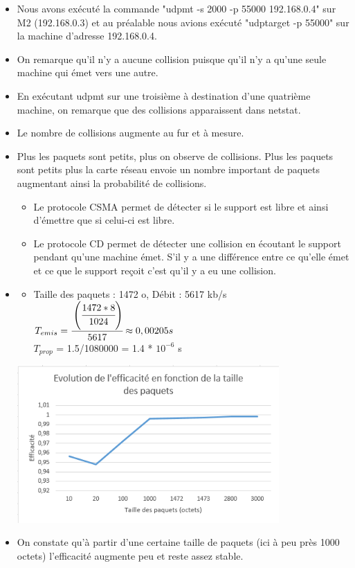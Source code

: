 \documentclass{report}
\begin{document}
\begin{itemize}\renewcommand{\labelitemi}{$\bullet$}
\item Nous avons exécuté la commande "udpmt -s 2000 -p 55000 192.168.0.4" sur M2 (192.168.0.3) et au préalable nous avions exécuté "udptarget -p 55000" sur la machine d'adresse 192.168.0.4.
\item On remarque qu'il n'y a aucune collision puisque qu'il n'y a qu'une seule machine qui émet vers une autre.
\item En exécutant udpmt sur une troisième à destination d'une quatrième machine, on remarque que des collisions apparaissent dans netstat.
\item Le nombre de collisions augmente au fur et à mesure. 
\item Plus les paquets sont petits, plus on observe de collisions. Plus les paquets sont petits plus la carte réseau envoie un nombre important de paquets augmentant ainsi la probabilité de collisions.
	\begin{itemize}
	\item Le protocole CSMA permet de détecter si le support est libre et ainsi d'émettre que si celui-ci est libre.
	\item Le protocole CD permet de détecter une collision en écoutant le support pendant qu'une machine émet. S'il y a une différence entre ce qu'elle émet et ce que le support reçoit c'est qu'il y a eu une collision.
	\end{itemize}
\item \begin{itemize}
	\item Taille des paquets : 1472 o, Débit : 5617 kb/s\\
\begin{math}T_{emis} = \cfrac{\left(\cfrac{1472*8}{1024}\right)}{5617}\approx 0,00205 s \end{math}\\
$T_{prop}$ = 1.5/1080000 = 1.4 * $10^{-6}$ s
	\end{itemize} 
\includegraphics[width=10cm]{efficacite.png}\\
\item On constate qu'à partir d'une certaine taille de paquets (ici à peu près 1000 octets) l'efficacité augmente peu et reste assez stable.
\end{itemize}
\end{document}
